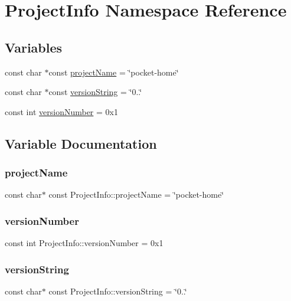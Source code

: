 \hypertarget{namespaceProjectInfo}{}\section{Project\+Info Namespace Reference}
\label{namespaceProjectInfo}
\subsection*{Variables}
\begin{DoxyCompactItemize}
\item 
const char $\ast$const \mbox{\hyperlink{namespaceProjectInfo_a4799ab8fd176c4b6ae5c3d18abd34e90}{project\+Name}} = \char`\"{}pocket-\/home\char`\"{}
\item 
const char $\ast$const \mbox{\hyperlink{namespaceProjectInfo_aa732d37f3fa040f3e828abde0869995f}{version\+String}} = \char`\"{}0..\char`\"{}
\item 
const int \mbox{\hyperlink{namespaceProjectInfo_a47348f5af69191e0835dbc3185f4937f}{version\+Number}} = 0x1
\end{DoxyCompactItemize}


\subsection{Variable Documentation}
\mbox{\label{namespaceProjectInfo_a4799ab8fd176c4b6ae5c3d18abd34e90}} 
\subsubsection{\texorpdfstring{project\+Name}{projectName}}
{\footnotesize\ttfamily const char$\ast$ const Project\+Info\+::project\+Name = \char`\"{}pocket-\/home\char`\"{}}

\mbox{\label{namespaceProjectInfo_a47348f5af69191e0835dbc3185f4937f}} 
\subsubsection{\texorpdfstring{version\+Number}{versionNumber}}
{\footnotesize\ttfamily const int Project\+Info\+::version\+Number = 0x1}

\mbox{\label{namespaceProjectInfo_aa732d37f3fa040f3e828abde0869995f}} 
\subsubsection{\texorpdfstring{version\+String}{versionString}}
{\footnotesize\ttfamily const char$\ast$ const Project\+Info\+::version\+String = \char`\"{}0..\char`\"{}}

